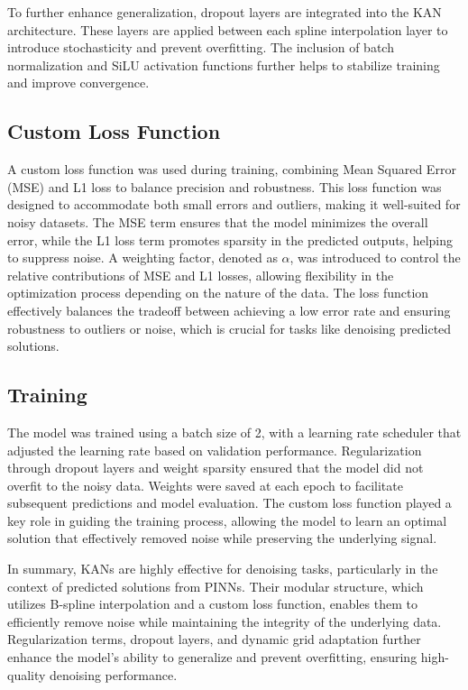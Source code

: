 \documentclass[conference]{IEEEtran}
\begin{document}
To further enhance generalization, dropout layers are integrated into the KAN architecture. These layers are applied between each spline interpolation layer to introduce stochasticity and prevent overfitting. The inclusion of batch normalization and SiLU activation functions further helps to stabilize training and improve convergence.

\subsection{Custom Loss Function}
A custom loss function was used during training, combining Mean Squared Error (MSE) and L1 loss to balance precision and robustness. This loss function was designed to accommodate both small errors and outliers, making it well-suited for noisy datasets. The MSE term ensures that the model minimizes the overall error, while the L1 loss term promotes sparsity in the predicted outputs, helping to suppress noise. A weighting factor, denoted as $\alpha$, was introduced to control the relative contributions of MSE and L1 losses, allowing flexibility in the optimization process depending on the nature of the data. The loss function effectively balances the tradeoff between achieving a low error rate and ensuring robustness to outliers or noise, which is crucial for tasks like denoising predicted solutions.

\subsection{Training}
The model was trained using a batch size of 2, with a learning rate scheduler that adjusted the learning rate based on validation performance. Regularization through dropout layers and weight sparsity ensured that the model did not overfit to the noisy data. Weights were saved at each epoch to facilitate subsequent predictions and model evaluation. The custom loss function played a key role in guiding the training process, allowing the model to learn an optimal solution that effectively removed noise while preserving the underlying signal.

In summary, KANs are highly effective for denoising tasks, particularly in the context of predicted solutions from PINNs. Their modular structure, which utilizes B-spline interpolation and a custom loss function, enables them to efficiently remove noise while maintaining the integrity of the underlying data. Regularization terms, dropout layers, and dynamic grid adaptation further enhance the model's ability to generalize and prevent overfitting, ensuring high-quality denoising performance.
\end{document}
